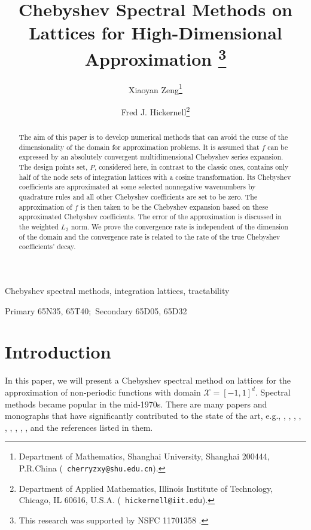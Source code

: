 \documentclass[article]{siamltex}
\begin{document}




\title{Chebyshev Spectral Methods on Lattices for High-Dimensional
Approximation \thanks{This research was supported by NSFC 11701358 .}}


\author{
Xiaoyan Zeng\thanks{Department of  Mathematics,
 Shanghai University, Shanghai 200444, P.R.China ({\tt
cherryzxy@shu.edu.cn}).}\and
Fred J. Hickernell\thanks{Department of Applied Mathematics,
 Illinois Institute of Technology, Chicago, IL 60616, U.S.A. ({\tt
hickernell@iit.edu}).}
}

\date{}
\maketitle

\begin{abstract}
The aim of this paper is to develop numerical methods that can
avoid the curse of the dimensionality of the domain for
approximation problems. It is assumed that $f$ can be expressed by
an absolutely convergent multidimensional Chebyshev series
expansion. The design points set, $P$, considered here, in
contrast to the classic ones, contains only half of the node sets
of integration lattices with a cosine transformation. Its
Chebyshev coefficients are approximated at some selected
nonnegative wavenumbers by  quadrature rules and all other
Chebyshev coefficients are set to be zero. The approximation of
$f$ is then taken to be the Chebyshev expansion based on these
approximated Chebyshev coefficients. The error of the
approximation is discussed in the weighted $L_2$ norm.  We prove
the convergence rate is independent of the dimension of the domain
and the convergence rate is related to the rate of the true
Chebyshev coefficients' decay.
\end{abstract}

\begin{keywords}
 Chebyshev spectral methods, integration lattices, tractability
\end{keywords}

\begin{AMS}
Primary 65N35, 65T40;~Secondary 65D05, 65D32
\end{AMS}
\section{Introduction} In this paper, we will present a Chebyshev
spectral method on lattices for the approximation of non-periodic
functions with domain $\mathcal X=[-1,1]^d.$ Spectral methods
became popular in the mid-1970s. There are many papers and
monographs that have significantly contributed to the state of the
art, e.g., \cite{BernardiM1997}, \cite{Boyd2000},
\cite{CanutoHQZ1988}, \cite{Don1994}, \cite{Fornberg1995}, \cite{Gottlieb1984},
\cite{GottliebO1977}, \cite{Mercier1989},
 \cite{ShenT07},\cite{Trefethen2000}
 and the references listed in them.
\end{document}
